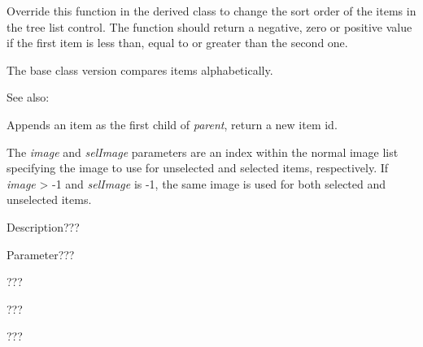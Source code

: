 Override this function in the derived class to change the sort order of the
items in the tree list control. The function should return a negative, zero or
positive value if the first item is less than, equal to or greater than the
second one.

The base class version compares items alphabetically.

See also: 

\label{wxtreelistctrlprependitem}


Appends an item as the first child of {\it parent}, return a new item id.

The {\it image} and {\it selImage} parameters are an index within
the normal image list specifying the image to use for unselected and
selected items, respectively.
If {\it image} > -1 and {\it selImage} is -1, the same image is used for
both selected and unselected items.

\label{wxtreelistctrlrefresh}


Description???

Parameter???

\label{wxtreelistctrlsetbackgroundcolour}


???

\label{wxtreelistctrlsetfocus}


???

\label{wxtreelistctrlsetfont}


???

\label{wxtreelistctrlsetforegroundcolour}


